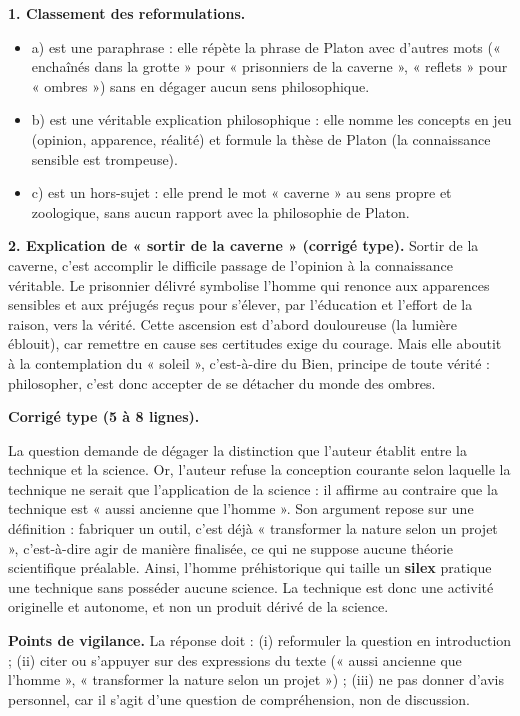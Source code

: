 \documentclass[11pt]{article}
\newcommand{\cle}[1]{{\popxbold\color{popdark}#1}}
\begin{document}
\begin{corrige}
\textbf{1. Classement des reformulations.}
\begin{itemize}
\item a) est une \cle{paraphrase} : elle répète la phrase de Platon avec d'autres mots (« enchaînés dans la grotte » pour « prisonniers de la caverne », « reflets » pour « ombres ») sans en dégager aucun sens philosophique.
\item b) est une véritable \cle{explication philosophique} : elle nomme les concepts en jeu (opinion, apparence, réalité) et formule la thèse de Platon (la connaissance sensible est trompeuse).
\item c) est un \cle{hors-sujet} : elle prend le mot « caverne » au sens propre et zoologique, sans aucun rapport avec la philosophie de Platon.
\end{itemize}

\textbf{2. Explication de « sortir de la caverne » (corrigé type).} Sortir de la caverne, c'est accomplir le difficile passage de l'opinion à la connaissance véritable. Le prisonnier délivré symbolise l'homme qui renonce aux apparences sensibles et aux préjugés reçus pour s'élever, par l'éducation et l'effort de la raison, vers la vérité. Cette ascension est d'abord douloureuse (la lumière éblouit), car remettre en cause ses certitudes exige du courage. Mais elle aboutit à la contemplation du « soleil », c'est-à-dire du Bien, principe de toute vérité : philosopher, c'est donc accepter de se détacher du monde des ombres.
\end{corrige}

\begin{corrige}
\textbf{Corrigé type (5 à 8 lignes).}

La question demande de dégager la distinction que l'auteur établit entre la technique et la science. Or, l'auteur refuse la conception courante selon laquelle la technique ne serait que l'application de la science : il affirme au contraire que la technique est « aussi ancienne que l'homme ». Son argument repose sur une définition : fabriquer un outil, c'est déjà « transformer la nature selon un projet », c'est-à-dire agir de manière finalisée, ce qui ne suppose aucune théorie scientifique préalable. Ainsi, l'homme préhistorique qui taille un \textbf{silex} pratique une technique sans posséder aucune science. La technique est donc une activité originelle et autonome, et non un produit dérivé de la science.

\textbf{Points de vigilance.} La réponse doit : (i) reformuler la question en introduction ; (ii) citer ou s'appuyer sur des expressions du texte (« aussi ancienne que l'homme », « transformer la nature selon un projet ») ; (iii) ne pas donner d'avis personnel, car il s'agit d'une question de compréhension, non de discussion.
\end{corrige}
\end{document}
